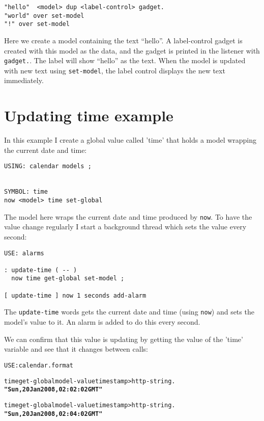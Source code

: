 \begin{verbatim}
"hello"  <model> dup <label-control> gadget.
"world" over set-model
"!" over set-model
\end{verbatim}

Here we create a model containing the text ``hello''. A label-control gadget is created with this model as the data, and the gadget is printed in the listener with \verb|gadget.|. The label will show ``hello'' as the text. When the model is updated with new text using \verb|set-model|, the label control displays the new text immediately.

\section{Updating time example}

In this example I create a global value called 'time' that holds a
model wrapping the current date and time:

\begin{verbatim}
USING: calendar models ;


SYMBOL: time
now <model> time set-global
\end{verbatim}

The model here wraps the current date and time produced by
\verb|now|. To have the value change regularly I start a background
thread which sets the value every second:

\begin{verbatim}
USE: alarms

: update-time ( -- )
  now time get-global set-model ;

[ update-time ] now 1 seconds add-alarm
\end{verbatim}

The \verb|update-time| words gets the current date and time (using \verb|now|)
and sets the model's value to it. An alarm is added to do this every second.

We can confirm that this value is updating by getting the value of
the 'time' variable and see that it changes between calls:

\begin{alltt}
USE: calendar.format

time get-global model-value timestamp>http-string .
  \textbf{"Sun, 20 Jan 2008, 02:02:02 GMT"} 

time get-global model-value timestamp>http-string .
  \textbf{"Sun, 20 Jan 2008, 02:04:02 GMT" }
\end{alltt}

